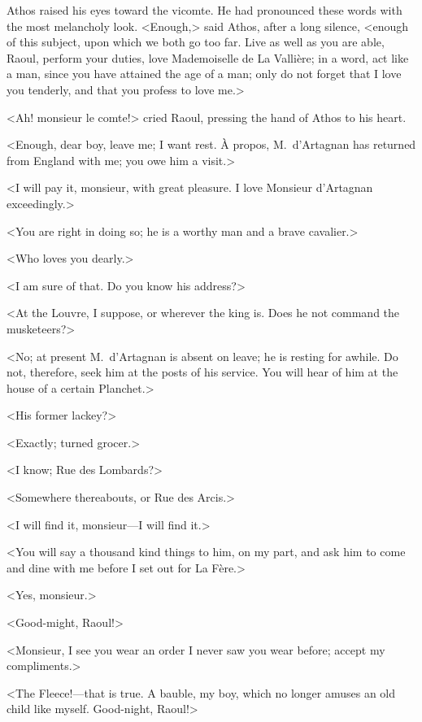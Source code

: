 Athos raised his eyes toward the vicomte. He had pronounced these words with the most melancholy look. <Enough,> said Athos, after a long silence, <enough of this subject, upon which we both go too far. Live as well as you are able, Raoul, perform your duties, love Mademoiselle de La Vallière; in a word, act like a man, since you have attained the age of a man; only do not forget that I love you tenderly, and that you profess to love me.>

<Ah! monsieur le comte!> cried Raoul, pressing the hand of Athos to his heart.

<Enough, dear boy, leave me; I want rest. À propos, M.~d'Artagnan has returned from England with me; you owe him a visit.>

<I will pay it, monsieur, with great pleasure. I love Monsieur d'Artagnan exceedingly.>

<You are right in doing so; he is a worthy man and a brave cavalier.>

<Who loves you dearly.>

<I am sure of that. Do you know his address?>

<At the Louvre, I suppose, or wherever the king is. Does he not command the musketeers?>

<No; at present M.~d'Artagnan is absent on leave; he is resting for awhile. Do not, therefore, seek him at the posts of his service. You will hear of him at the house of a certain Planchet.>

<His former lackey?>

<Exactly; turned grocer.>

<I know; Rue des Lombards?>

<Somewhere thereabouts, or Rue des Arcis.>

<I will find it, monsieur—I will find it.>

<You will say a thousand kind things to him, on my part, and ask him to come and dine with me before I set out for La Fère.>

<Yes, monsieur.>

<Good-might, Raoul!>

<Monsieur, I see you wear an order I never saw you wear before; accept my compliments.>

<The Fleece!—that is true. A bauble, my boy, which no longer amuses an old child like myself. Good-night, Raoul!> 